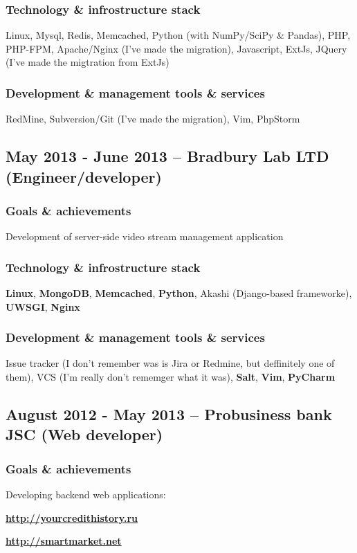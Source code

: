 \documentclass[9pt, a4paper, english]{extarticle}
\begin{document}
    \subsubsection* {Technology \& infrostructure stack}
      Linux, Mysql, Redis, Memcached, Python (with NumPy/SciPy \& Pandas),
      PHP, PHP-FPM, Apache/Nginx (I've made the migration), Javascript,
      ExtJs, JQuery (I've made the migtration from ExtJs)
    \subsubsection* {Development \& management tools \& services}
      RedMine, Subversion/Git (I've made the migration), Vim, PhpStorm


  \subsection* {May 2013 - June 2013 -- \textbf{Bradbury Lab LTD} (Engineer/developer)}
    \subsubsection* {Goals \& achievements}
      Development of server-side video stream management application
    \subsubsection* {Technology \& infrostructure stack}
      \textbf{Linux}, \textbf{MongoDB}, \textbf{Memcached}, \textbf{Python}, Akashi (Django-based frameworke),
      \textbf{UWSGI}, \textbf{Nginx}
    \subsubsection* {Development \& management tools \& services}
      Issue tracker (I don't remember was is Jira or Redmine, but deffinitely one of them), VCS (I'm really
      don't rememger what it was), \textbf{Salt}, \textbf{Vim}, \textbf{PyCharm}

  \subsection* {August 2012 - May 2013 -- \textbf{Probusiness bank JSC} (Web developer)}
    \subsubsection* {Goals \& achievements}
      Developing backend web applications:
      \begin {list}{\textbullet}{\itemsep=0mm}
        \item \textbf{\url{http://yourcredithistory.ru}}
        \item \textbf{\url{http://smartmarket.net}}
      \end {list}
\end{document}
